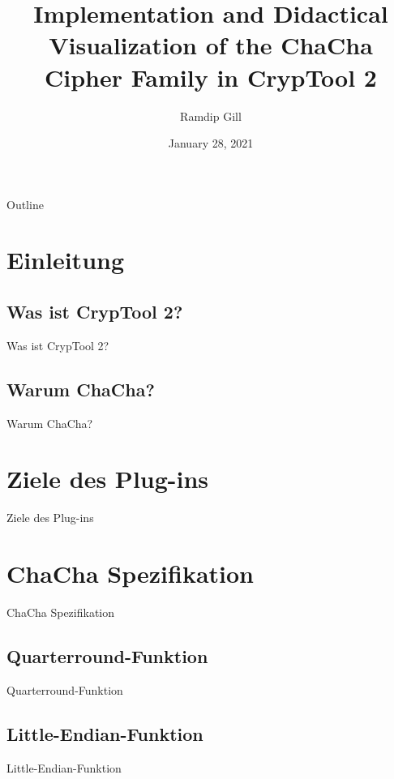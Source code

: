 \documentclass{beamer}
\title[Impl. and Visualization of the ChaCha Cipher Family in CT2]{Implementation and Didactical Visualization of the ChaCha Cipher Family in CrypTool 2}
\author{Ramdip Gill}
\institute{University of Heidelberg}
\date{January 28, 2021}
\begin{document}
\begin{frame}[plain]
  \titlepage
\end{frame}

\begin{frame}[plain]{Outline}
  \tableofcontents
\end{frame}

\section{Einleitung}

\subsection{Was ist CrypTool 2?}
\begin{frame}{Was ist CrypTool 2?}
\end{frame}

\subsection{Warum ChaCha?}
\begin{frame}{Warum ChaCha?}
\end{frame}

\section{Ziele des Plug-ins}
\begin{frame}{Ziele des Plug-ins}
\end{frame}

\section{ChaCha Spezifikation}
\begin{frame}{ChaCha Spezifikation}
\end{frame}

\subsection{Quarterround-Funktion}
\begin{frame}{Quarterround-Funktion}
\end{frame}

\subsection{Little-Endian-Funktion}
\begin{frame}{Little-Endian-Funktion}
\end{frame}
\end{document}
